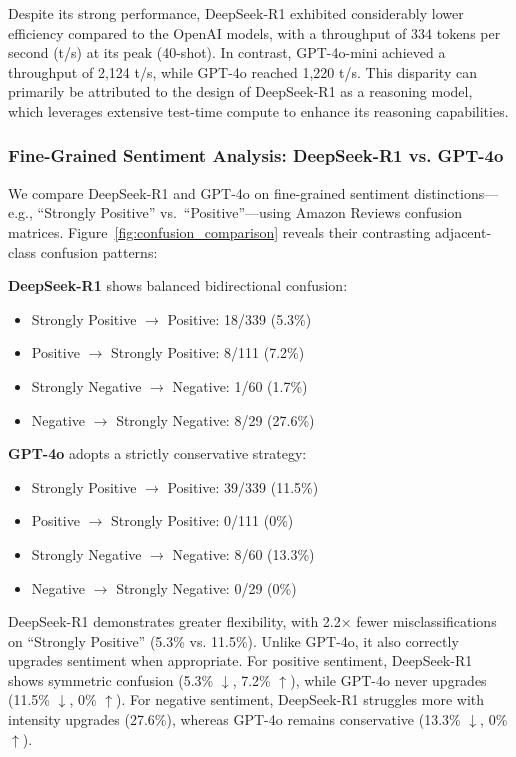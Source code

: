 \documentclass{IEEEcsmag}
\begin{document}
Despite its strong performance, DeepSeek-R1 exhibited considerably lower efficiency compared to the OpenAI models, with a throughput of 334 tokens per second (t/s) at its peak (40-shot). In contrast, GPT-4o-mini achieved a throughput of 2,124 t/s, while GPT-4o reached 1,220 t/s. This disparity can primarily be attributed to the design of DeepSeek-R1 as a reasoning model, which leverages extensive test-time compute to enhance its reasoning capabilities.

\subsubsection{\textbf{Fine-Grained Sentiment Analysis: DeepSeek-R1 vs. GPT-4o}} 
We compare DeepSeek-R1 and GPT-4o on fine-grained sentiment distinctions—e.g., “Strongly Positive” vs.\ “Positive”—using Amazon Reviews confusion matrices. Figure~\ref{fig:confusion_comparison} reveals their contrasting adjacent-class confusion patterns:

\textbf{DeepSeek-R1} shows balanced bidirectional confusion:
\begin{itemize}[itemsep=1pt, topsep=1pt, leftmargin=*]
    \item Strongly Positive $\rightarrow$ Positive: 18/339 (5.3\%)
    \item Positive $\rightarrow$ Strongly Positive: 8/111 (7.2\%)
    \item Strongly Negative $\rightarrow$ Negative: 1/60 (1.7\%)
    \item Negative $\rightarrow$ Strongly Negative: 8/29 (27.6\%)
\end{itemize}

\textbf{GPT-4o} adopts a strictly conservative strategy:
\begin{itemize}[itemsep=1pt, topsep=1pt, leftmargin=*]
    \item Strongly Positive $\rightarrow$ Positive: 39/339 (11.5\%)
    \item Positive $\rightarrow$ Strongly Positive: 0/111 (0\%)
    \item Strongly Negative $\rightarrow$ Negative: 8/60 (13.3\%)
    \item Negative $\rightarrow$ Strongly Negative: 0/29 (0\%)
\end{itemize}

DeepSeek-R1 demonstrates greater flexibility, with 2.2$\times$ fewer misclassifications on ``Strongly Positive'' (5.3\% vs. 11.5\%). Unlike GPT-4o, it also correctly upgrades sentiment when appropriate. For positive sentiment, DeepSeek-R1 shows symmetric confusion (5.3\% $\downarrow$, 7.2\% $\uparrow$), while GPT-4o never upgrades (11.5\% $\downarrow$, 0\% $\uparrow$). For negative sentiment, DeepSeek-R1 struggles more with intensity upgrades (27.6\%), whereas GPT-4o remains conservative (13.3\% $\downarrow$, 0\% $\uparrow$).
\end{document}
